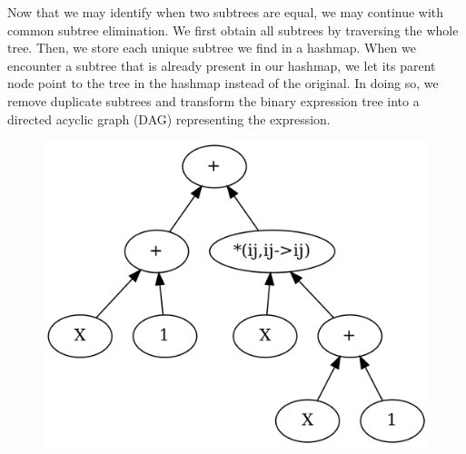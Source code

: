 \documentclass[12pt, a4paper]{report}
\begin{document}
Now that we may identify when two subtrees are equal, we may continue with common subtree elimination.
We first obtain all subtrees by traversing the whole tree.
Then, we store each unique subtree we find in a hashmap.
When we encounter a subtree that is already present in our hashmap, we let its parent node point to the tree in the hashmap instead of the original.
In doing so, we remove duplicate subtrees and transform the binary expression tree into a directed acyclic graph (DAG) representing the expression.
\begin{figure}
    \centering
    \begin{minipage}{7cm}
        \centering
        \includegraphics[scale=0.15]{tree.png}
    \end{minipage}
    \begin{minipage}{7cm}
        \centering

\end{minipage}
\end{figure}
\end{document}
